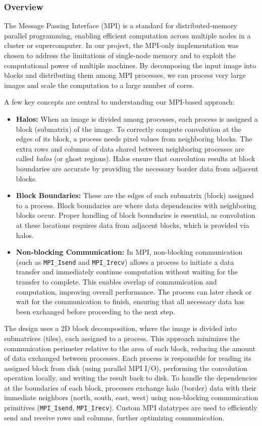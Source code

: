 \documentclass[conference, 10pt]{IEEEtran}
\begin{document}
\subsubsection{Overview}
The Message Passing Interface (MPI) is a standard for distributed-memory parallel programming, enabling efficient computation across multiple nodes in a cluster or supercomputer. In our project, the MPI-only implementation was chosen to address the limitations of single-node memory and to exploit the computational power of multiple machines. By decomposing the input image into blocks and distributing them among MPI processes, we can process very large images and scale the computation to a large number of cores.

A few key concepts are central to understanding our MPI-based approach:
\begin{itemize}
    \item \textbf{Halos:} When an image is divided among processes, each process is assigned a block (submatrix) of the image. To correctly compute convolution at the edges of its block, a process needs pixel values from neighboring blocks. The extra rows and columns of data shared between neighboring processes are called \textit{halos} (or ghost regions). Halos ensure that convolution results at block boundaries are accurate by providing the necessary border data from adjacent blocks.
    \item \textbf{Block Boundaries:} These are the edges of each submatrix (block) assigned to a process. Block boundaries are where data dependencies with neighboring blocks occur. Proper handling of block boundaries is essential, as convolution at these locations requires data from adjacent blocks, which is provided via halos.
    \item \textbf{Non-blocking Communication:} In MPI, non-blocking communication (such as \texttt{MPI\_Isend} and \texttt{MPI\_Irecv}) allows a process to initiate a data transfer and immediately continue computation without waiting for the transfer to complete. This enables overlap of communication and computation, improving overall performance. The process can later check or wait for the communication to finish, ensuring that all necessary data has been exchanged before proceeding to the next step.
\end{itemize}

The design uses a 2D block decomposition, where the image is divided into submatrices (tiles), each assigned to a process. This approach minimizes the communication perimeter relative to the area of each block, reducing the amount of data exchanged between processes. Each process is responsible for reading its assigned block from disk (using parallel MPI I/O), performing the convolution operation locally, and writing the result back to disk. To handle the dependencies at the boundaries of each block, processes exchange halo (border) data with their immediate neighbors (north, south, east, west) using non-blocking communication primitives (\texttt{MPI\_Isend}, \texttt{MPI\_Irecv}). Custom MPI datatypes are used to efficiently send and receive rows and columns, further optimizing communication.
\end{document}
